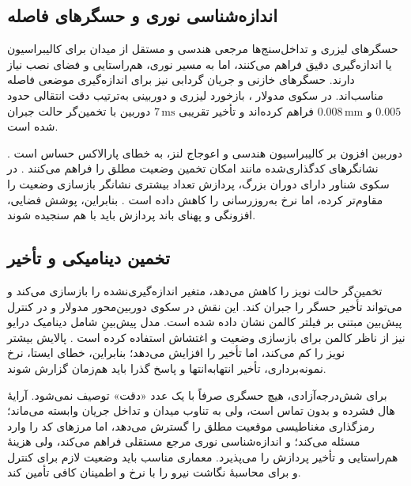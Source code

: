 \subsection{اندازه‌شناسی نوری و حسگرهای فاصله}
\label{subsec:optical-metrology}

حسگرهای لیزری و تداخل‌سنج‌ها مرجعی هندسی و مستقل از میدان برای کالیبراسیون یا اندازه‌گیری دقیق فراهم می‌کنند، اما به مسیر نوری، هم‌راستایی و فضای نصب نیاز دارند. حسگرهای خازنی و جریان گردابی نیز برای اندازه‌گیری موضعی فاصله مناسب‌اند. در سکوی مدولار \cite{curtisstewartImplementationModularMagnetic2023}، بازخورد لیزری و دوربینی به‌ترتیب دقت انتقالی حدود $0.005$ و $0.008\,\mathrm{mm}$ فراهم کرده‌اند و تأخیر تقریبی $7\,\mathrm{ms}$ دوربین با تخمین‌گر حالت جبران شده است.

دوربین افزون بر کالیبراسیون هندسی و اعوجاج لنز، به خطای پارالاکس حساس است \cite{sayedAutomaticDensityMeasurement2026}. نشانگرهای کدگذاری‌شده مانند  امکان تخمین وضعیت مطلق را فراهم می‌کنند \cite{wangAprilTag2Efficient2016}. در سکوی شناور دارای دوران بزرگ، پردازش تعداد بیشتری نشانگر بازسازی وضعیت را مقاوم‌تر کرده، اما نرخ به‌روزرسانی را کاهش داده است \cite{miyasakaMagneticLevitationUnlimited2014}. بنابراین، پوشش فضایی، افزونگی و پهنای باند پردازش باید با هم سنجیده شوند.

\subsection{تخمین دینامیکی و تأخیر}
\label{subsec:dynamic-state-estimation}

تخمین‌گر حالت نویز را کاهش می‌دهد، متغیر اندازه‌گیری‌نشده را بازسازی می‌کند و می‌تواند تأخیر حسگر را جبران کند. این نقش در سکوی دوربین‌محور مدولار \cite{curtisstewartImplementationModularMagnetic2023} و در کنترل پیش‌بین مبتنی بر فیلتر کالمن \cite{xuPredictorbasedModelPredictive2023} نشان داده شده است. مدل پیش‌بینِ شامل دینامیک درایو نیز از ناظر کالمن برای بازسازی وضعیت و اغتشاش استفاده کرده است \cite{ranDriveaugmentedModelPredictive2025}. پالایش بیشتر نویز را کم می‌کند، اما تأخیر را افزایش می‌دهد؛ بنابراین، خطای ایستا، نرخ نمونه‌برداری، تأخیر انتهابه‌انتها و پاسخ گذرا باید هم‌زمان گزارش شوند.

\label{subsec:sensing-metrology-summary}
برای  شش‌درجه‌آزادی، هیچ حسگری صرفاً با یک عدد «دقت» توصیف نمی‌شود. آرایهٔ هال فشرده و بدون تماس است، ولی به تناوب میدان و تداخل جریان وابسته می‌ماند؛ رمزگذاری مغناطیسی موقعیت مطلق را گسترش می‌دهد، اما مرزهای کد را وارد مسئله می‌کند؛ و اندازه‌شناسی نوری مرجع مستقلی فراهم می‌کند، ولی هزینهٔ هم‌راستایی و تأخیر پردازش را می‌پذیرد. معماری مناسب باید وضعیت لازم برای کنترل و برای محاسبهٔ نگاشت نیرو را با نرخ و اطمینان کافی تأمین کند.

